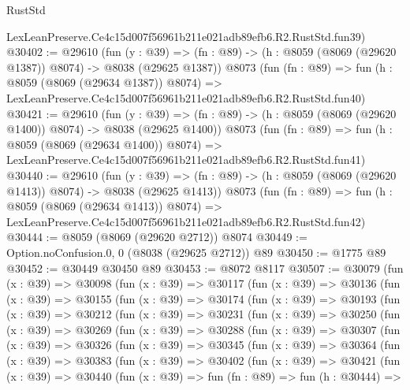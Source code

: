 \begin{lexlean}{RustStd}
\begin{coremodule}
    LexLeanPreserve.Ce4c15d007f56961b211e021adb89efb6.R2.RustStd.fun39)
@30402 := @29610
    (fun (y : @39) =>
    (fn : @89) -> (h : @8059 (@8069 (@29620 @1387)) @8074) -> @8038 (@29625 @1387))
    @8073
    (fun (fn : @89) =>
    fun (h : @8059 (@8069 (@29634 @1387)) @8074) =>
    LexLeanPreserve.Ce4c15d007f56961b211e021adb89efb6.R2.RustStd.fun40)
@30421 := @29610
    (fun (y : @39) =>
    (fn : @89) -> (h : @8059 (@8069 (@29620 @1400)) @8074) -> @8038 (@29625 @1400))
    @8073
    (fun (fn : @89) =>
    fun (h : @8059 (@8069 (@29634 @1400)) @8074) =>
    LexLeanPreserve.Ce4c15d007f56961b211e021adb89efb6.R2.RustStd.fun41)
@30440 := @29610
    (fun (y : @39) =>
    (fn : @89) -> (h : @8059 (@8069 (@29620 @1413)) @8074) -> @8038 (@29625 @1413))
    @8073
    (fun (fn : @89) =>
    fun (h : @8059 (@8069 (@29634 @1413)) @8074) =>
    LexLeanPreserve.Ce4c15d007f56961b211e021adb89efb6.R2.RustStd.fun42)
@30444 := @8059 (@8069 (@29620 @2712)) @8074
@30449 := Option.noConfusion.{0, 0} (@8038 (@29625 @2712)) @89
@30450 := @1775 @89
@30452 := @30449 @30450 @89
@30453 := @8072 @8117
@30507 := @30079
    (fun (x : @39) =>
    @30098
      (fun (x : @39) =>
      @30117
        (fun (x : @39) =>
        @30136
          (fun (x : @39) =>
          @30155
            (fun (x : @39) =>
            @30174
              (fun (x : @39) =>
              @30193
                (fun (x : @39) =>
                @30212
                  (fun (x : @39) =>
                  @30231
                    (fun (x : @39) =>
                    @30250
                      (fun (x : @39) =>
                      @30269
                        (fun (x : @39) =>
                        @30288
                          (fun (x : @39) =>
                          @30307
                            (fun (x : @39) =>
                            @30326
                              (fun (x : @39) =>
                              @30345
                                (fun (x : @39) =>
                                @30364
                                  (fun (x : @39) =>
                                  @30383
                                    (fun (x : @39) =>
                                    @30402
                                      (fun (x : @39) =>
                                      @30421
                                        (fun (x : @39) =>
                                        @30440
                                          (fun (x : @39) =>
                                          fun (fn : @89) =>
                                          fun (h : @30444) =>

\end{coremodule}
\end{lexlean}
